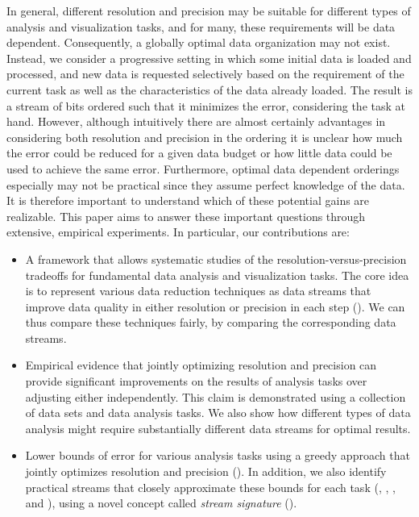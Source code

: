 In general, different
resolution and precision may be suitable for different types of analysis and visualization tasks,
and for many, these requirements will be
data dependent. Consequently, a globally optimal data organization may not exist. 
Instead, we consider a progressive setting in which some initial data is loaded
and processed, and new data is requested selectively based on the requirement
of the current task as well as the characteristics of the data already loaded. The
result is a stream of bits ordered such that it minimizes the error, considering the task at hand.
However, although intuitively there are almost certainly advantages in considering both resolution and precision in the ordering it is unclear how much the error could be reduced for a given data budget or how little data could be used to achieve the same error.
Furthermore, optimal data dependent orderings especially may not be practical since they assume perfect knowledge of the data. It is therefore important to understand which of these potential gains are realizable.
This paper aims to answer these important questions through extensive, empirical experiments. 
In particular, our contributions are:

\begin{itemize}
%
\item A framework that allows systematic studies of the
resolution-versus-precision tradeoffs for fundamental data analysis and
visualization tasks. The core idea is to represent various data reduction
techniques as data streams that improve data quality in either resolution or
precision in each step (). We can
thus compare these techniques fairly, by comparing the corresponding data
streams.
%  
\item Empirical evidence that jointly optimizing resolution and
precision can provide significant improvements on the results of analysis tasks
over adjusting either independently.  This claim is demonstrated using a
collection of data sets and data analysis tasks. We also show how different
types of data analysis might require substantially different data streams for
optimal results.
%
\item Lower bounds of error   for various analysis tasks using a greedy approach
that jointly optimizes resolution and precision ().
 In addition, we also identify practical streams that
closely approximate these bounds for each task (,
, , and ), using
a novel concept called \emph{stream signature} ().
\end{itemize}


